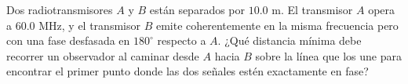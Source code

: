 \item Dos radiotransmisores $A$ y $B$ están separados por $10.0\text{ m}$. El transmisor $A$ opera a $60.0\text{ MHz}$, y el transmisor $B$ emite coherentemente en la misma frecuencia pero con una fase desfasada en $180^\circ$ respecto a $A$. ¿Qué distancia mínima debe recorrer un observador al caminar desde $A$ hacia $B$ sobre la línea que los une para encontrar el primer punto donde las dos señales estén exactamente en fase?